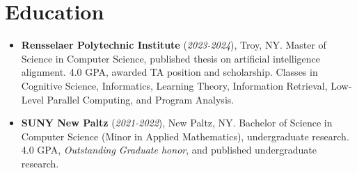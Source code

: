\documentclass[11pt]{article}
\begin{document}
\section*{Education}
\begin{itemize}
    \itemsep0em

    \item \textbf{Rensselaer Polytechnic Institute} (\textit{2023-2024}), Troy, NY. Master of Science in Computer Science, published thesis on artificial intelligence alignment.  4.0 GPA, awarded TA position and scholarship.  Classes in Cognitive Science, Informatics, Learning Theory, Information Retrieval, Low-Level Parallel Computing, and Program Analysis.
    \item \textbf{SUNY New Paltz} (\textit{2021-2022}), New Paltz, NY. Bachelor of Science in Computer Science (Minor in Applied Mathematics), undergraduate research. 4.0 GPA, \textit{Outstanding Graduate honor}, and published undergraduate research.

\end{itemize}
\end{document}
